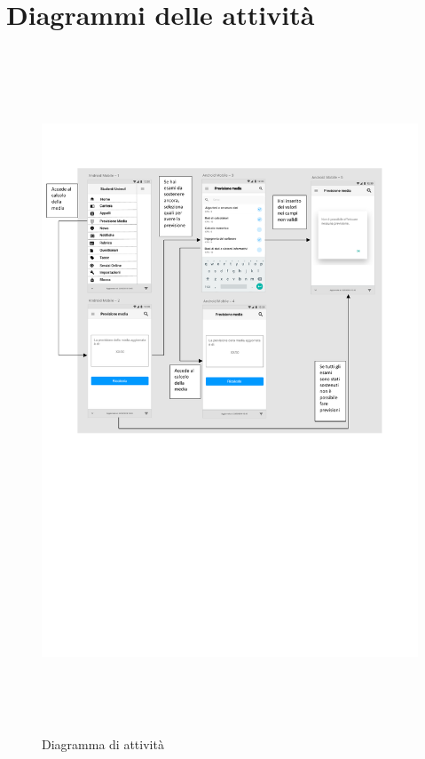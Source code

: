\section{Diagrammi delle attività}

\begin{figure}[H]
	\centering
	\includegraphics[height=8in]{imgs/gruppo3/diagramma-di-attivita.pdf}
	\caption{Diagramma di attività}
	\label{fig:prova}
\end{figure}
